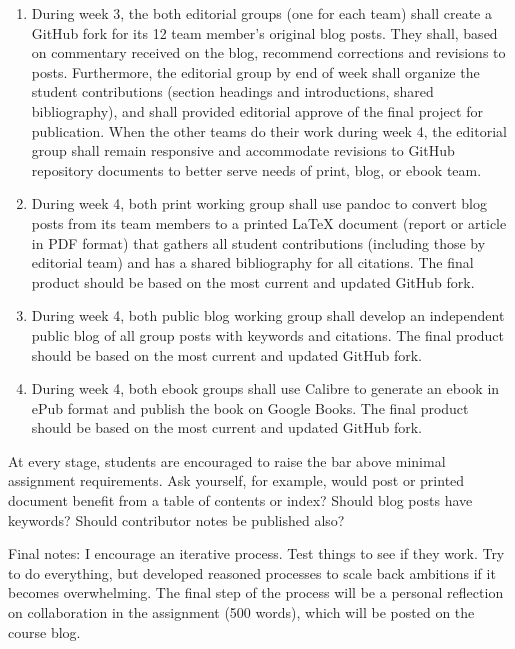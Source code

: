\documentclass[]{article}
\begin{document}
\begin{enumerate}
\def\labelenumi{\arabic{enumi}.}
\setcounter{enumi}{4}
\itemsep1pt\parskip0pt
\item
  During week 3, the both editorial groups (one for each team) shall
  create a GitHub fork for its 12 team member's original blog posts.
  They shall, based on commentary received on the blog, recommend
  corrections and revisions to posts. Furthermore, the editorial group
  by end of week shall organize the student contributions (section
  headings and introductions, shared bibliography), and shall provided
  editorial approve of the final project for publication. When the other
  teams do their work during week 4, the editorial group shall remain
  responsive and accommodate revisions to GitHub repository documents to
  better serve needs of print, blog, or ebook team.
\item
  During week 4, both print working group shall use pandoc to convert
  blog posts from its team members to a printed LaTeX document (report
  or article in PDF format) that gathers all student contributions
  (including those by editorial team) and has a shared bibliography for
  all citations. The final product should be based on the most current
  and updated GitHub fork.
\item
  During week 4, both public blog working group shall develop an
  independent public blog of all group posts with keywords and
  citations. The final product should be based on the most current and
  updated GitHub fork.
\item
  During week 4, both ebook groups shall use Calibre to generate an
  ebook in ePub format and publish the book on Google Books. The final
  product should be based on the most current and updated GitHub fork.
\end{enumerate}

At every stage, students are encouraged to raise the bar above minimal
assignment requirements. Ask yourself, for example, would post or
printed document benefit from a table of contents or index? Should blog
posts have keywords? Should contributor notes be published also?

Final notes: I encourage an iterative process. Test things to see if
they work. Try to do everything, but developed reasoned processes to
scale back ambitions if it becomes overwhelming. The final step of the
process will be a personal reflection on collaboration in the assignment
(500 words), which will be posted on the course blog.
\end{document}
